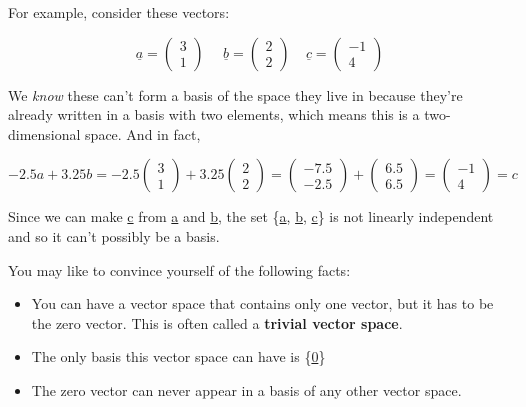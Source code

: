 \documentclass[oneside,english]{amsbook}
\numberwithin{section}{chapter}
\theoremstyle{plain}
\theoremstyle{definition}
\begin{document}
For example, consider these vectors:

\[\underline{a} = \begin{pmatrix}
	3 \\
	1
\end{pmatrix}\ \ \ \ \ \ \underline{b} = \begin{pmatrix}
	2 \\
	2
\end{pmatrix}\ \ \ \ \ \underline{c} = \begin{pmatrix}
	- 1 \\
	4
\end{pmatrix}\]

We \emph{know} these can't form a basis of the space they live in
because they're already written in a basis with two elements, which
means this is a two-dimensional space. And in fact,

\[- 2.5a + 3.25b = - 2.5\begin{pmatrix}
	3 \\
	1
\end{pmatrix} + 3.25\begin{pmatrix}
	2 \\
	2
\end{pmatrix} = \begin{pmatrix}
	- 7.5 \\
	- 2.5
\end{pmatrix} + \begin{pmatrix}
	6.5 \\
	6.5
\end{pmatrix} = \begin{pmatrix}
	- 1 \\
	4
\end{pmatrix} = c\]

Since we can make \ul{c} from \ul{a} and \ul{b}, the set \{\ul{a},
\ul{b}, \ul{c}\} is not linearly independent and so it can't possibly be
a basis.

You may like to convince yourself of the following facts:

\begin{itemize}
	\item
	You can have a vector space that contains only one vector, but it has
	to be the zero vector. This is often called a \textbf{trivial vector
		space}.
	\item
	The only basis this vector space can have is \{\ul{0}\}
	\item
	The zero vector can never appear in a basis of any other vector space.
\end{itemize}
\end{document}
